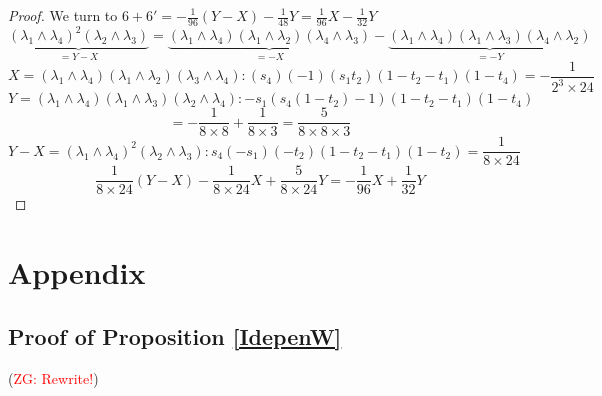\documentclass[11pt]{amsart}
\theoremstyle{definition}
\theoremstyle{remark}
\numberwithin{equation}{section}
\newcommand{\Gui}[1]{(\textcolor{red}{ZG: #1})}
\begin{document}
\begin{proof}
We turn to $\boxed{6}+\boxed{6'}=-\frac{1}{96}(Y-X)-\frac{1}{48}Y=\frac{1}{96}X-\frac{1}{32}Y$
$$
\underbrace{\left(\lambda_1 \wedge \lambda_4\right)^2\left(\lambda_2 \wedge \lambda_3\right)}_{=Y-X}=\underbrace{\left(\lambda_1 \wedge \lambda_4\right)\left(\lambda_1 \wedge \lambda_2\right)\left(\lambda_4 \wedge \lambda_3\right)}_{=-X}-\underbrace{\left(\lambda_1 \wedge \lambda_4\right)\left(\lambda_1 \wedge \lambda_3\right)\left(\lambda_4 \wedge \lambda_2\right)}_{=-Y}
$$
$$
X=\left(\lambda_1 \wedge \lambda_4\right)\left(\lambda_1 \wedge \lambda_2\right)\left(\lambda_3 \wedge \lambda_4\right):(s_4)(-1)(s_1t_2)(1-t_2-t_1)(1-t_4)=-\frac{1}{2^3\times 24}
$$
$$
Y=\left(\lambda_1 \wedge \lambda_4\right)\left(\lambda_1 \wedge \lambda_3\right)\left(\lambda_2 \wedge \lambda_4\right):-s_1(s_4(1-t_2)-1)(1-t_2-t_1)(1-t_4)
$$
$$
=-\frac{1}{8\times 8}+\frac{1}{8\times 3}=\frac{5}{8\times 8\times 3}
$$
$$
Y-X=\left(\lambda_1 \wedge \lambda_4\right)^2\left(\lambda_2 \wedge \lambda_3\right):s_4(-s_1)(-t_2)(1-t_2-t_1)(1-t_2)=\frac{1}{8\times 24}
$$
$$
\frac{1}{8\times 24}(Y-X)-\frac{1}{8\times 24}X+\frac{5}{8\times 24}Y=-\frac{1}{96}X+\frac{1}{32}Y
$$

\end{proof}
\fi
\section{Appendix}
\subsection{Proof of Proposition \ref{IdepenW}}\label{ProofIdepenW}
\Gui{Rewrite!}
\end{document}
